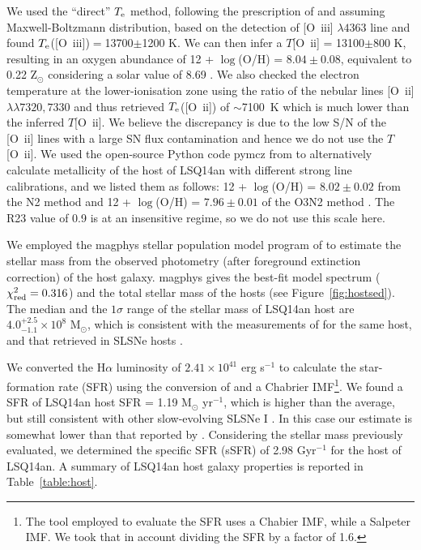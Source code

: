 \documentclass[useAMS,usenatbib]{mn2e}
\def\Ha{H{$\alpha$}}
\def\M{M$_{\odot}$}
\def\an{LSQ14an}
\def\oiii{[O~{\sc iii}]}
\def\oii{[O~{\sc ii}]}
\begin{document}
We used the ``direct'' $T_{\rm e}$ method, following the prescription of \citet{2013ApJS..207...21N} and assuming Maxwell-Boltzmann distribution, based on the detection of \oiii\/ $\lambda4363$ line and found $T_{\rm e}$(\oiii)$=$13700$\pm$1200 K.
We can then infer a $T$[O~{\sc ii}] = 13100$\pm$800 K, resulting in an oxygen abundance of 12 + $\log$(O/H) = $8.04 \pm 0.08$,  equivalent to 0.22 Z$_{\odot}$ considering a solar value of 8.69 \citep{2009ARA&A..47..481A}. 
We also checked the electron temperature at the lower-ionisation zone using the ratio of the nebular lines \oii\/ $\lambda\lambda7320, 7330$ and thus retrieved $T_{\rm e}$(\oii) of $\sim$7100~K which is much lower than the inferred $T$[O~{\sc ii}]. We believe the discrepancy is due to the low S/N of the \oii\/ lines with a large SN flux contamination and hence we do not use the $T$[O~{\sc ii}].
We used the open-source {\sc Python} code {\sc pymcz} from \citet{bianco16} to alternatively calculate metallicity of the host of LSQ14an with different strong line calibrations, and we listed them as follows:
12 + $\log$(O/H) = $8.02 \pm 0.02$ from the N2 method \citep[][]{pp04} and 12 + $\log$(O/H) = $7.96 \pm 0.01$ of the O3N2 method \citep[][]{pp04}. The R23 value of 0.9 is at an insensitive regime, so we do not use this scale here.

We employed the {\sc magphys} stellar population model program of \citet{2008MNRAS.388.1595D} to estimate the stellar mass from the observed photometry (after foreground extinction correction) of the host galaxy.
{\sc magphys} gives the best-fit model spectrum ($\chi^{2}_{\rm red} = 0.316$) and the total stellar mass of the hosts (see Figure~\ref{fig:hostsed}). The median and the $1\sigma$ range of the stellar mass of \an\/ host are  
$4.0^{+2.5}_{-1.1} \times 10^{8}$ \M\/, which is consistent with the measurements of \citet{sch16} for the same host, and that retrieved in SLSNe hosts \citep[e.g.][]{lu14,le15,pe16}.

We converted the \Ha\/ luminosity of $2.41 \times 10^{41}$ erg s$^{-1}$ to calculate the star-formation rate (SFR) using the conversion of \citet{1998ARA&A..36..189K} and a Chabrier IMF\footnote{The tool employed to evaluate the SFR uses a Chabier IMF, while \citet{1998ARA&A..36..189K} a Salpeter IMF. We took that in account dividing the SFR by a factor of 1.6. }.
We found a SFR of LSQ14an host SFR = 1.19 \M\/ yr$^{-1}$, which is higher than the average, but still consistent with other slow-evolving SLSNe I \citep[e.g.][]{ch15,le15}. In this case our estimate is somewhat lower than that reported by \citet{sch16}.
Considering the stellar mass previously evaluated, we determined the specific SFR (sSFR) of 2.98 Gyr$^{-1}$ for the host of LSQ14an. A summary of \an\/ host galaxy properties is reported in Table~\ref{table:host}.
\end{document}

